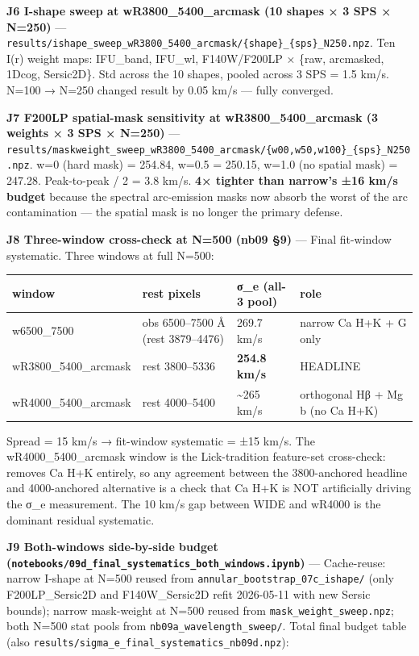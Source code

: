 \documentclass[
  10pt,
]{article}
\begin{document}
\textbf{J6 I-shape sweep at wR3800\_5400\_arcmask (10 shapes × 3 SPS × N=250)} --- \texttt{results/ishape\_sweep\_wR3800\_5400\_arcmask/\{shape\}\_\{sps\}\_N250.npz}. Ten I(r) weight maps: IFU\_band,
IFU\_wl, F140W/F200LP × \{raw, arcmasked, 1Dcog, Sersic2D\}. Std across the 10 shapes, pooled across 3 SPS = 1.5 km/s. N=100 → N=250 changed result by 0.05 km/s --- fully converged.

\textbf{J7 F200LP spatial-mask sensitivity at wR3800\_5400\_arcmask (3 weights × 3 SPS × N=250)} --- \texttt{results/maskweight\_sweep\_wR3800\_5400\_arcmask/\{w00,w50,w100\}\_\{sps\}\_N250.npz}. w=0
(hard mask) = 254.84, w=0.5 = 250.15, w=1.0 (no spatial mask) = 247.28. Peak-to-peak / 2 = 3.8 km/s. \textbf{4× tighter than narrow's ±16 km/s budget} because the spectral arc-emission masks now
absorb the worst of the arc contamination --- the spatial mask is no longer the primary defense.

\textbf{J8 Three-window cross-check at N=500 (nb09 §9)} --- Final fit-window systematic. Three windows at full N=500:

\begingroup\small\setlength{\tabcolsep}{4pt}\begin{longtable}[]{@{}llll@{}}
\toprule
window & rest pixels & σ\_e (all-3 pool) & role \\
\midrule
\endhead
w6500\_7500 & obs 6500--7500 Å (rest 3879--4476) & 269.7 km/s & narrow Ca H+K + G only \\
wR3800\_5400\_arcmask & rest 3800--5336 & \textbf{254.8 km/s} & HEADLINE \\
wR4000\_5400\_arcmask & rest 4000--5400 & \textasciitilde265 km/s & orthogonal Hβ + Mg b (no Ca H+K) \\
\bottomrule
\end{longtable}\endgroup

Spread = 15 km/s → fit-window systematic = ±15 km/s. The wR4000\_5400\_arcmask window is the Lick-tradition feature-set cross-check: removes Ca H+K entirely, so any agreement between the 3800-anchored
headline and 4000-anchored alternative is a check that Ca H+K is NOT artificially driving the σ\_e measurement. The 10 km/s gap between WIDE and wR4000 is the dominant residual systematic.

\textbf{J9 Both-windows side-by-side budget (\texttt{notebooks/09d\_final\_systematics\_both\_windows.ipynb})} --- Cache-reuse: narrow I-shape at N=500 reused from
\texttt{annular\_bootstrap\_07c\_ishape/} (only F200LP\_Sersic2D and F140W\_Sersic2D refit 2026-05-11 with new Sersic bounds); narrow mask-weight at N=500 reused from \texttt{mask\_weight\_sweep.npz};
both N=500 stat pools from \texttt{nb09a\_wavelength\_sweep/}. Total final budget table (also \texttt{results/sigma\_e\_final\_systematics\_nb09d.npz}):
\end{document}
